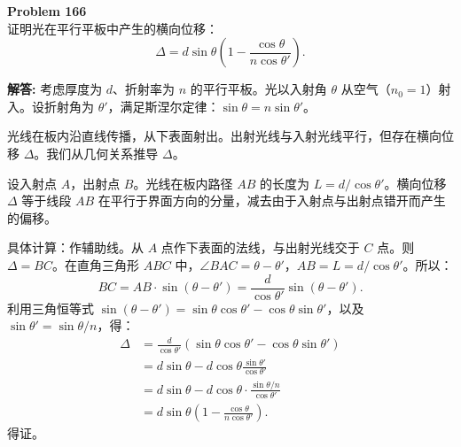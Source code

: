 \documentclass[12pt, a4paper, oneside]{ctexart}
\newenvironment{solution}{\par\noindent\textbf{解答:}\quad}{\par}
\begin{document}
\begin{mdframed}[backgroundcolor=gray!10, linewidth=0pt]
    \textbf{Problem 166} \\
    证明光在平行平板中产生的横向位移：
    \[
    \Delta = d \sin\theta \left( 1 - \frac{\cos\theta}{n \cos\theta'} \right).
    \]
\end{mdframed}
\begin{solution}
    考虑厚度为 $d$、折射率为 $n$ 的平行平板。光以入射角 $\theta$ 从空气（$n_0=1$）射入。设折射角为 $\theta'$，满足斯涅尔定律：$\sin\theta = n \sin\theta'$。

    光线在板内沿直线传播，从下表面射出。出射光线与入射光线平行，但存在横向位移 $\Delta$。我们从几何关系推导 $\Delta$。

    设入射点 $A$，出射点 $B$。光线在板内路径 $AB$ 的长度为 $L = d / \cos\theta'$。横向位移 $\Delta$ 等于线段 $AB$ 在平行于界面方向的分量，减去由于入射点与出射点错开而产生的偏移。

    具体计算：作辅助线。从 $A$ 点作下表面的法线，与出射光线交于 $C$ 点。则 $\Delta = BC$。在直角三角形 $ABC$ 中，$\angle BAC = \theta - \theta'$，$AB = L = d/\cos\theta'$。所以：
    \[
    BC = AB \cdot \sin(\theta - \theta') = \frac{d}{\cos\theta'} \sin(\theta - \theta').
    \]
    利用三角恒等式 $\sin(\theta - \theta') = \sin\theta\cos\theta' - \cos\theta\sin\theta'$，以及 $\sin\theta' = \sin\theta / n$，得：
    \begin{align*}
        \Delta &= \frac{d}{\cos\theta'} (\sin\theta\cos\theta' - \cos\theta\sin\theta') \\
        &= d \sin\theta - d \cos\theta \frac{\sin\theta'}{\cos\theta'} \\
        &= d \sin\theta - d \cos\theta \cdot \frac{\sin\theta / n}{\cos\theta'} \\
        &= d \sin\theta \left( 1 - \frac{\cos\theta}{n \cos\theta'} \right).
    \end{align*}
    得证。
\end{solution}
\end{document}
